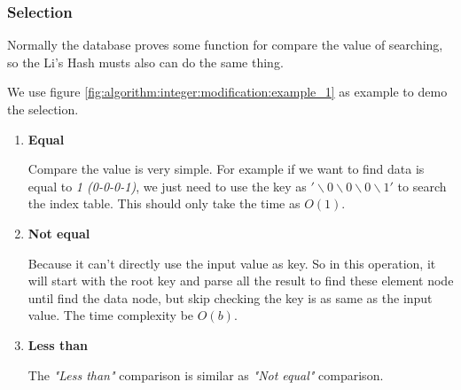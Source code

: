 \subsubsection{Selection}

Normally the database proves some function for compare the value of searching, so the Li's Hash musts also can do the same thing.

We use figure \ref{fig:algorithm:integer:modification:example_1} as example to demo the selection.

\begin{enumerate}


\item \textbf{Equal}

Compare the value is very simple. For example if we want to find data is equal to \textit{1 (0-0-0-1)}, we just need to use the key as $'\backslash0\backslash0\backslash0\backslash1'$ to search the index table. This should only take the time as $O(1)$.


\item \textbf{Not equal}

Because it can't directly use the input value as key. So in this operation, it will start with the root key and parse all the result to find these element node until find the data node, but skip checking the key is as same as the input value. The time complexity be $O(b)$.


\item \textbf{Less than}

The \emph{"Less than"} comparison is similar as \emph{"Not equal"} comparison.

\end{enumerate}
